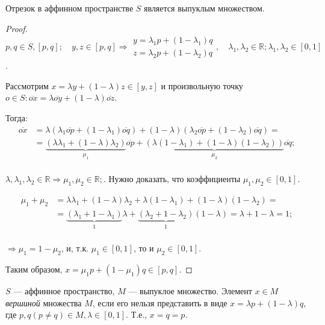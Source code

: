\begin{utv}
	Отрезок в аффинном пространстве $S$ является выпуклым множеством.
\end{utv}
\begin{proof}
	$p, q \in S, [p, q]; \quad y, z \in [p, q] \Rightarrow \begin{matrix}
		y = \lambda_1 p + (1 - \lambda_1) q \\
		z = \lambda_2 p + (1 - \lambda_2) q
	\end{matrix}, \quad \lambda_1, \lambda_2 \in \mathbb{R}; \lambda_1, \lambda_2 \in [0, 1]$. 
	
	Рассмотрим $x = \lambda y + (1 - \lambda) z \in [y, z]$ и произвольную точку $o \in S: \overline{ox} = \lambda \overline{oy} + (1 - \lambda) \overline{oz}$.
	
	Тогда:
	\begin{align*}
		\overline{ox} &= \lambda (\lambda_1 \overline{op} + (1 - \lambda_1) \overline{oq}) + (1 - \lambda) (\lambda_2 \overline{op} + (1 - \lambda_2) \overline{oq}) = \\ &= \underbrace{(\lambda \lambda_1 + (1 - \lambda) \lambda_2)}_{\mu_1} \overline{op} + \underbrace{(\lambda (1 - \lambda_1) + (1 - \lambda) (1 - \lambda_2))}_{\mu_2} \overline{oq}; \\
	\end{align*}
	
	$\lambda, \lambda_1, \lambda_2 \in \mathbb{R} \Rightarrow \mu_1, \mu_2 \in \mathbb{R};$. Нужно доказать, что коэффициенты $\mu_1, \mu_2 \in [0, 1]$. 
	
	\begin{align*}
		\mu_1 + \mu_2 &= \lambda \lambda_1 + (1 - \lambda) \lambda_2 + \lambda (1 - \lambda_1) + (1 - \lambda) (1 - \lambda_2) = \\ &= \underbrace{(\lambda_1 + 1 - \lambda_1)}_{1} \lambda + \underbrace{(\lambda_2 + 1 - \lambda_2)}_{1} (1 - \lambda) = \lambda + 1 - \lambda = 1; \\
	\end{align*}
	
	$\Rightarrow \mu_1 = 1 - \mu_2$, и, т.к. $\mu_1 \in [0,1]$, то и $\mu_2 \in [0, 1]$. 
	
	Таким образом, $x = \mu_1 p + (1 - \mu_1) q \in [p, q]$. 
\end{proof}

\begin{definition}
	$S$ --- аффинное пространство, $M$ --- выпуклое множество. Элемент $x \in M$ \textit{вершиной} множества $M$, если его нельзя представить в виде $x = \lambda p + (1 - \lambda) q$, где $p, q (p \not = q) \in M, \lambda \in [0, 1]$. Т.е., $x = q = p$. 
\end{definition}
